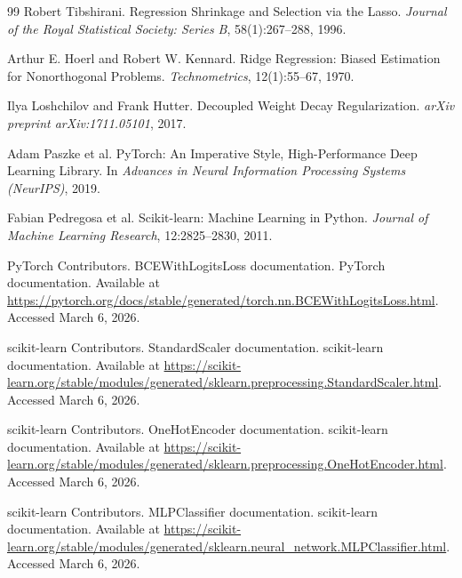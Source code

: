 \documentclass{article}
\begin{document}
\begin{thebibliography}{99}
Robert Tibshirani.
\newblock Regression Shrinkage and Selection via the Lasso.
\newblock \emph{Journal of the Royal Statistical Society: Series B}, 58(1):267--288, 1996.

Arthur E. Hoerl and Robert W. Kennard.
\newblock Ridge Regression: Biased Estimation for Nonorthogonal Problems.
\newblock \emph{Technometrics}, 12(1):55--67, 1970.

Ilya Loshchilov and Frank Hutter.
\newblock Decoupled Weight Decay Regularization.
\newblock \emph{arXiv preprint arXiv:1711.05101}, 2017.

Adam Paszke et al.
\newblock PyTorch: An Imperative Style, High-Performance Deep Learning Library.
\newblock In \emph{Advances in Neural Information Processing Systems (NeurIPS)}, 2019.

Fabian Pedregosa et al.
\newblock Scikit-learn: Machine Learning in Python.
\newblock \emph{Journal of Machine Learning Research}, 12:2825--2830, 2011.

PyTorch Contributors.
\newblock BCEWithLogitsLoss documentation.
\newblock PyTorch documentation. Available at \url{https://pytorch.org/docs/stable/generated/torch.nn.BCEWithLogitsLoss.html}. Accessed March 6, 2026.

scikit-learn Contributors.
\newblock StandardScaler documentation.
\newblock scikit-learn documentation. Available at \url{https://scikit-learn.org/stable/modules/generated/sklearn.preprocessing.StandardScaler.html}. Accessed March 6, 2026.

scikit-learn Contributors.
\newblock OneHotEncoder documentation.
\newblock scikit-learn documentation. Available at \url{https://scikit-learn.org/stable/modules/generated/sklearn.preprocessing.OneHotEncoder.html}. Accessed March 6, 2026.

scikit-learn Contributors.
\newblock MLPClassifier documentation.
\newblock scikit-learn documentation. Available at \url{https://scikit-learn.org/stable/modules/generated/sklearn.neural_network.MLPClassifier.html}. Accessed March 6, 2026.

\end{thebibliography}
\end{document}
